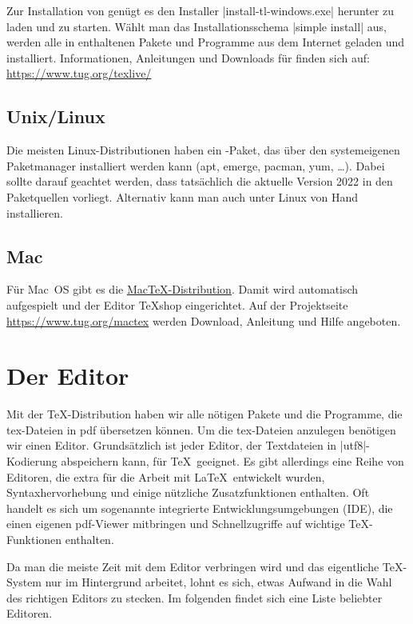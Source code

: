 \documentclass[
	ausgabe=2023-02-08,
	titel=Installationshinweise,
	shortverb=true,
]{../tex/latexkurs-exercise}
\begin{document}
Zur Installation von \TeXlive genügt es den Installer |install-tl-windows.exe| herunter zu laden und zu starten. Wählt man das Installationsschema |simple install| aus, werden alle in \TeXlive enthaltenen Pakete und Programme aus dem Internet geladen und installiert. Informationen, Anleitungen und Downloads für \TeXlive finden sich auf:\\ \url{https://www.tug.org/texlive/}

\subsection*{Unix/Linux}
Die meisten Linux-Distributionen haben ein \TeXlive-Paket, das über den systemeigenen Paketmanager installiert werden kann (apt, emerge, pacman, yum, …).
Dabei sollte darauf geachtet werden, dass tatsächlich die aktuelle Version 2022 in den Paketquellen vorliegt. Alternativ kann man \TeXlive auch unter Linux von Hand installieren.


\subsection*{Mac}
Für Mac~OS gibt es die \href{https://www.tug.org/mactex}{Mac\TeX-Distribution}. Damit wird automatisch  \TeXlive aufgespielt und  der Editor \TeX shop eingerichtet. Auf der Projektseite \url{https://www.tug.org/mactex} werden Download, Anleitung und Hilfe angeboten.





\section{Der Editor}

Mit der \TeX-Distribution haben wir alle nötigen Pakete und die Programme, die tex-Dateien in pdf übersetzen können. Um die tex-Dateien anzulegen benötigen wir einen Editor. Grundsätzlich ist jeder Editor, der Textdateien in |utf8|-Kodierung abspeichern kann, für \TeX\ geeignet. Es gibt allerdings eine Reihe von Editoren, die extra für die Arbeit mit \LaTeX\ entwickelt wurden, Syntaxhervorhebung und einige nützliche Zusatzfunktionen enthalten. Oft handelt es sich um sogenannte integrierte Entwicklungsumgebungen (IDE), die einen eigenen pdf-Viewer mitbringen und Schnellzugriffe auf wichtige \TeX-Funktionen enthalten.

Da man die meiste Zeit mit dem Editor verbringen wird und das eigentliche \TeX-System nur im Hintergrund arbeitet, lohnt es sich, etwas Aufwand in die Wahl des richtigen Editors zu stecken. Im folgenden findet sich eine Liste beliebter Editoren.
\end{document}
